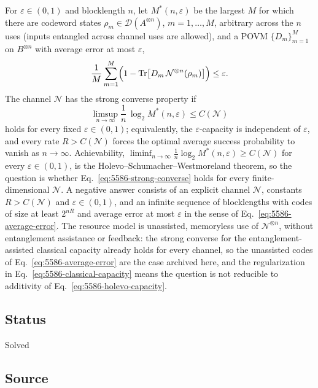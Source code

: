 For $\varepsilon\in(0,1)$ and blocklength $n$, let $M^*(n,\varepsilon)$ be the
largest $M$ for which there are codeword states
$\rho_m\in\mathcal D(A^{\otimes n})$, $m=1,\dots,M$, arbitrary across the $n$
uses (inputs entangled across channel uses are allowed), and a POVM
$\{D_m\}_{m=1}^M$ on $B^{\otimes n}$ with average error at most $\varepsilon$,
\begin{equation}
  \frac1M\sum_{m=1}^M
  \Bigl(1-\operatorname{Tr}\bigl[D_m\,\mathcal N^{\otimes n}(\rho_m)\bigr]\Bigr)
  \le\varepsilon.
  \label{eq:5586-average-error}
\end{equation}
The channel $\mathcal N$ has the strong converse property if
\begin{equation}
  \limsup_{n\to\infty}\frac1n\,\log_2 M^*(n,\varepsilon)\le C(\mathcal N)
  \label{eq:5586-strong-converse}
\end{equation}
holds for every fixed $\varepsilon\in(0,1)$; equivalently, the
$\varepsilon$-capacity is independent of $\varepsilon$, and every rate
$R>C(\mathcal N)$ forces the optimal average success probability to vanish as
$n\to\infty$.  Achievability, $\liminf_{n\to\infty}\frac1n\log_2
M^*(n,\varepsilon)\ge C(\mathcal N)$ for every $\varepsilon\in(0,1)$, is the
Holevo--Schumacher--Westmoreland theorem, so the question is whether
Eq.~\eqref{eq:5586-strong-converse} holds for every finite-dimensional
$\mathcal N$.  A negative answer consists of an explicit channel $\mathcal N$,
constants $R>C(\mathcal N)$ and $\varepsilon\in(0,1)$, and an infinite sequence of
blocklengths with codes of size at least $2^{nR}$ and average error at most
$\varepsilon$ in the sense of Eq.~\eqref{eq:5586-average-error}.  The resource
model is unassisted, memoryless use of $\mathcal N^{\otimes n}$, without
entanglement assistance or feedback: the strong converse for the
entanglement-assisted classical capacity already holds for every channel, so
the unassisted codes of Eq.~\eqref{eq:5586-average-error} are the case archived here,
and the regularization in Eq.~\eqref{eq:5586-classical-capacity} means the
question is not reducible to additivity of
Eq.~\eqref{eq:5586-holevo-capacity}.

\subsection*{Status}

Solved

\subsection*{Source}

